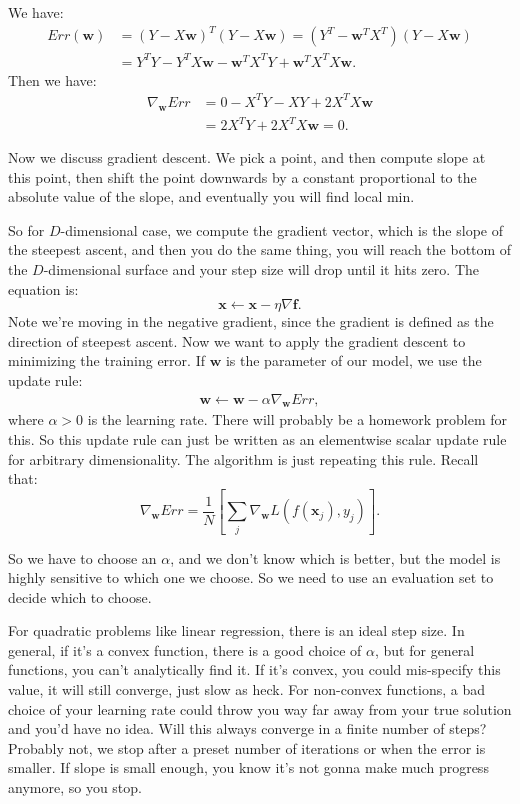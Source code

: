 \documentclass{amsbook}
\theoremstyle{plain}
\numberwithin{section}{chapter}
\numberwithin{equation}{chapter}
\theoremstyle{definition}
\theoremstyle{remark}
\newcommand{\vecc}{\mathbf}
\newcommand{\bee}{\begin{equation}\begin{aligned}}
\newcommand{\eee}{\end{aligned}\end{equation}}
\newcommand{\fracc}{\frac}
\begin{document}
We have:
\bee
Err(\vecc{w}) &= (Y - X\vecc{w})^T(Y - X\vecc{w}) = (Y^T - \vecc{w}^TX^T)(Y - X\vecc{w})\\
&= Y^TY - Y^TX\vecc{w} - \vecc{w}^TX^TY + \vecc{w}^TX^TX\vecc{w}.
\eee
Then we have:
\bee
\nabla_{\vecc{w}}Err &= 0 - X^TY - XY + 2X^TX\vecc{w}\\
&= 2X^TY + 2X^TX\vecc{w} = 0.
\eee

Now we discuss gradient descent. We pick a point, and then compute slope at this point, then shift the point downwards by a constant proportional to the absolute value of the slope, and eventually you will find local min. 


So for $D$-dimensional case, we compute the gradient vector, which is the slope of the steepest ascent, and then you do the same thing, you will reach the bottom of the $D$-dimensional surface and your step size will drop until it hits zero. The equation is:
$$
\vecc{x} \longleftarrow \vecc{x} -  \eta \nabla \vecc{f}.
$$
Note we're moving in the negative gradient, since the gradient is defined as the direction of steepest ascent. Now we want to apply the gradient descent to minimizing the training error. If $\vecc{w}$ is the parameter of our model, we use the update rule:
\bee
\vecc{w} \longleftarrow \vecc{w} - \alpha \nabla_{\vecc{w}}Err,
\eee
where $\alpha > 0$ is the learning rate. There will probably be a homework problem for this. So this update rule can just be written as an elementwise scalar update rule for arbitrary dimensionality. The algorithm is just repeating this rule. Recall that:
$$
\nabla_{\vecc{w}}Err = \fracc{1}{N}\left[\sum_j\nabla_{\vecc{w}}L(f(\vecc{x}_j),y_j) \right].
$$

So we have to choose an $\alpha$, and we don't know which is better, but the model is highly sensitive to which one we choose. So we need to use an evaluation set to decide which to choose. 

For quadratic problems like linear regression, there is an ideal step size. In general, if it's a convex function, there is a good choice of $\alpha$, but for general functions, you can't analytically find it. If it's convex, you could mis-specify this value, it will still converge, just slow as heck. For non-convex functions, a bad choice of your learning rate could throw you way far away from your true solution and you'd have no idea. Will this always converge in a finite number of steps? Probably not, we stop after a preset number of iterations or when the error is smaller. If slope is small enough, you know it's not gonna make much progress anymore, so you stop. 
\end{document}
